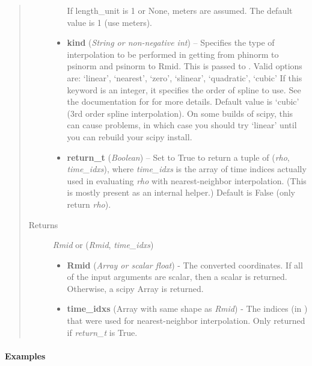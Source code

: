 \documentclass[letterpaper,10pt,english]{sphinxmanual}
\begin{document}
\begin{fulllineitems}
\begin{fulllineitems}
\begin{quote}
\begin{description}
\begin{itemize}
\begin{quote}
\end{quote}

If length\_unit is 1 or None, meters are assumed. The default
value is 1 (use meters).

\item {} 
\textbf{kind} (\emph{String or non-negative int}) --
Specifies the type of
interpolation to be performed in getting from phinorm to
psinorm and psinorm to Rmid. This is passed to
. Valid options are:
`linear', `nearest', `zero', `slinear', `quadratic', `cubic'
If this keyword is an integer, it specifies the order of spline
to use. See the documentation for  for more
details. Default value is `cubic' (3rd order spline
interpolation). On some builds of scipy, this can cause problems,
in which case you should try `linear' until you can rebuild your
scipy install.

\item {} 
\textbf{return\_t} (\emph{Boolean}) --
Set to True to return a tuple of (\emph{rho},
\emph{time\_idxs}), where \emph{time\_idxs} is the array of time indices
actually used in evaluating \emph{rho} with nearest-neighbor
interpolation. (This is mostly present as an internal helper.)
Default is False (only return \emph{rho}).

\end{itemize}

\item[{Returns}] \leavevmode

\emph{Rmid} or (\emph{Rmid}, \emph{time\_idxs})
\begin{itemize}
\item {} 
\textbf{Rmid} (\emph{Array or scalar float}) - The converted coordinates. If
all of the input arguments are scalar, then a scalar is returned.
Otherwise, a scipy Array is returned.

\item {} 
\textbf{time\_idxs} (Array with same shape as \emph{Rmid}) - The indices
(in ) that were used for
nearest-neighbor interpolation. Only returned if \emph{return\_t} is
True.

\end{itemize}


\end{description}\end{quote}
\paragraph{Examples}


\end{fulllineitems}
\end{fulllineitems}
\end{document}
